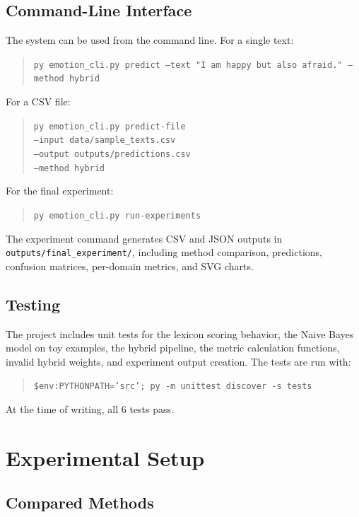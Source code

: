 \documentclass[11pt]{article}
\begin{document}
\subsection{Command-Line Interface}

The system can be used from the command line. For a single text:

\begin{quote}
\texttt{py emotion\_cli.py predict --text "I am happy but also afraid." --method hybrid}
\end{quote}

For a CSV file:

\begin{quote}
\small
\texttt{py emotion\_cli.py predict-file}\\
\texttt{--input data/sample\_texts.csv}\\
\texttt{--output outputs/predictions.csv}\\
\texttt{--method hybrid}
\end{quote}

For the final experiment:

\begin{quote}
\texttt{py emotion\_cli.py run-experiments}
\end{quote}

The experiment command generates CSV and JSON outputs in \texttt{outputs/final\_experiment/}, including method comparison, predictions, confusion matrices, per-domain metrics, and SVG charts.

\subsection{Testing}

The project includes unit tests for the lexicon scoring behavior, the Naive Bayes model on toy examples, the hybrid pipeline, the metric calculation functions, invalid hybrid weights, and experiment output creation. The tests are run with:

\begin{quote}
\texttt{\$env:PYTHONPATH='src'; py -m unittest discover -s tests}
\end{quote}

At the time of writing, all 6 tests pass.

\section{Experimental Setup}

\subsection{Compared Methods}
\end{document}
